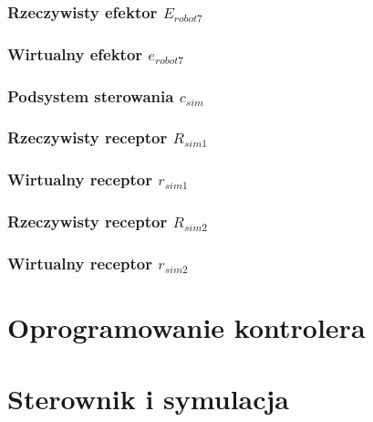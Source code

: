 \documentclass[a4paper, 12pt, twoside]{article}
\begin{document}
\subsubsection{Rzeczywisty efektor $E_{robot7}$}

\subsubsection{Wirtualny efektor $e_{robot7}$}

\subsubsection{Podsystem sterowania $c_{sim}$}

\subsubsection{Rzeczywisty receptor $R_{sim1}$}

\subsubsection{Wirtualny receptor $r_{sim1}$}

\subsubsection{Rzeczywisty receptor $R_{sim2}$}

\subsubsection{Wirtualny receptor $r_{sim2}$}


\newpage
\vspace*{1.5 cm}
\section{Oprogramowanie kontrolera}
\vspace{1.5 cm}


\newpage
\vspace*{1.5 cm}
\section{Sterownik i symulacja}
\vspace{1.5 cm}
\end{document}

